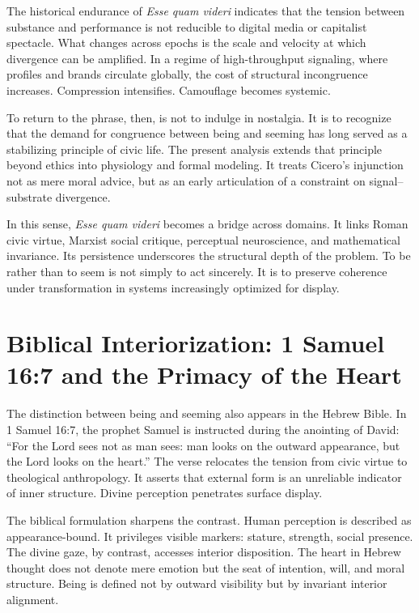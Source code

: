 \documentclass[11pt]{article}
\begin{document}
The historical endurance of \textit{Esse quam videri} indicates that the tension between substance and performance is not reducible to digital media or capitalist spectacle. What changes across epochs is the scale and velocity at which divergence can be amplified. In a regime of high-throughput signaling, where profiles and brands circulate globally, the cost of structural incongruence increases. Compression intensifies. Camouflage becomes systemic.

To return to the phrase, then, is not to indulge in nostalgia. It is to recognize that the demand for congruence between being and seeming has long served as a stabilizing principle of civic life. The present analysis extends that principle beyond ethics into physiology and formal modeling. It treats Cicero's injunction not as mere moral advice, but as an early articulation of a constraint on signal--substrate divergence.

In this sense, \textit{Esse quam videri} becomes a bridge across domains. It links Roman civic virtue, Marxist social critique, perceptual neuroscience, and mathematical invariance. Its persistence underscores the structural depth of the problem. To be rather than to seem is not simply to act sincerely. It is to preserve coherence under transformation in systems increasingly optimized for display.

\section{Biblical Interiorization: 1 Samuel 16:7 and the Primacy of the Heart}

The distinction between being and seeming also appears in the Hebrew Bible. In 1 Samuel 16:7, the prophet Samuel is instructed during the anointing of David: ``For the Lord sees not as man sees: man looks on the outward appearance, but the Lord looks on the heart.'' The verse relocates the tension from civic virtue to theological anthropology. It asserts that external form is an unreliable indicator of inner structure. Divine perception penetrates surface display.

The biblical formulation sharpens the contrast. Human perception is described as appearance-bound. It privileges visible markers: stature, strength, social presence. The divine gaze, by contrast, accesses interior disposition. The heart in Hebrew thought does not denote mere emotion but the seat of intention, will, and moral structure. Being is defined not by outward visibility but by invariant interior alignment.
\end{document}
